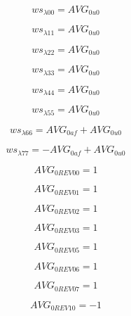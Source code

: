 \documentclass{article}
\begin{document}
\begin{dmath}ws_{\lambda 00} = AVG_{0 u0}\end{dmath}

\begin{dmath}ws_{\lambda 11} = AVG_{0 u0}\end{dmath}

\begin{dmath}ws_{\lambda 22} = AVG_{0 u0}\end{dmath}

\begin{dmath}ws_{\lambda 33} = AVG_{0 u0}\end{dmath}

\begin{dmath}ws_{\lambda 44} = AVG_{0 u0}\end{dmath}

\begin{dmath}ws_{\lambda 55} = AVG_{0 u0}\end{dmath}

\begin{dmath}ws_{\lambda 66} = AVG_{0 af} + AVG_{0 u0}\end{dmath}

\begin{dmath}ws_{\lambda 77} = - AVG_{0 af} + AVG_{0 u0}\end{dmath}

\begin{dmath}AVG_{0 REV 00} = 1\end{dmath}

\begin{dmath}AVG_{0 REV 01} = 1\end{dmath}

\begin{dmath}AVG_{0 REV 02} = 1\end{dmath}

\begin{dmath}AVG_{0 REV 03} = 1\end{dmath}

\begin{dmath}AVG_{0 REV 05} = 1\end{dmath}

\begin{dmath}AVG_{0 REV 06} = 1\end{dmath}

\begin{dmath}AVG_{0 REV 07} = 1\end{dmath}

\begin{dmath}AVG_{0 REV 10} = -1\end{dmath}
\end{document}
